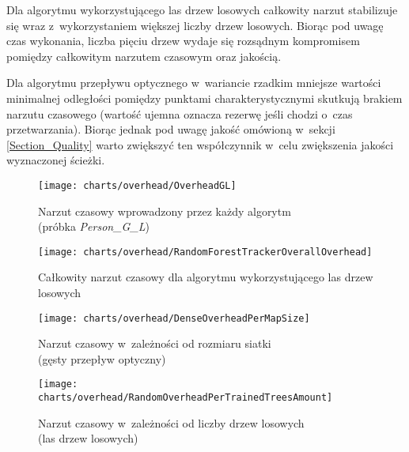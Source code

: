     Dla algorytmu wykorzystującego las drzew losowych całkowity narzut stabilizuje się wraz z~wykorzystaniem większej liczby drzew losowych. Biorąc pod uwagę czas wykonania, liczba pięciu drzew wydaje się rozsądnym kompromisem pomiędzy całkowitym narzutem czasowym oraz jakością.

    Dla algorytmu przepływu optycznego w~wariancie rzadkim mniejsze wartości minimalnej odległości pomiędzy punktami charakterystycznymi skutkują brakiem narzutu czasowego (wartość ujemna oznacza rezerwę jeśli chodzi o~czas przetwarzania). Biorąc jednak pod uwagę jakość omówioną w~sekcji \ref{Section_Quality} warto zwiększyć ten współczynnik w~celu zwiększenia jakości wyznaczonej ścieżki.

    \newpage
      \begin{figure}[!ht]
        \centering
        \texttt{[image: charts/overhead/OverheadGL]}
        \caption[Narzut czasowy wprowadzony przez każdy algorytm]
                {Narzut czasowy wprowadzony przez każdy algorytm\\(próbka \textit{Person\_G\_L})}
        \label{fig:OverheadGL}
      \end{figure}

      \begin{figure}[!ht]
        \centering
        \texttt{[image: charts/overhead/RandomForestTrackerOverallOverhead]}
        \caption[Całkowity narzut czasowy dla algorytmu wykorzystującego las drzew losowych]
                {Całkowity narzut czasowy dla algorytmu wykorzystującego las drzew losowych}
        \label{fig:RandomForestTrackerOverhead}
      \end{figure}

    \newpage
      \begin{figure}[!ht]
        \centering
        \texttt{[image: charts/overhead/DenseOverheadPerMapSize]}
        \caption[Narzut czasowy w~zależności od rozmiaru siatki]
                {Narzut czasowy w~zależności od rozmiaru siatki\\(gęsty przepływ optyczny)}
        \label{fig:SpecialisedDenseOverhead}
      \end{figure}

      \begin{figure}[!ht]
        \centering
        \texttt{[image: charts/overhead/RandomOverheadPerTrainedTreesAmount]}
        \caption[Narzut czasowy w~zależności od liczby drzew losowych]
                {Narzut czasowy w~zależności od liczby drzew losowych\\(las drzew losowych)}
        \label{fig:SpecialisedRandomOverhead}
      \end{figure}

